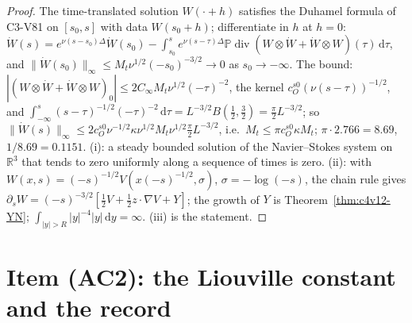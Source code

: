 \documentclass[11pt]{article}
\newcommand{\dd}{\,\mathrm d}
\newcommand{\PP}{\mathbb P}
\theoremstyle{plain}
\theoremstyle{definition}
\theoremstyle{remark}
\begin{document}
\begin{proof}
The time-translated solution \(W(\cdot+h)\) satisfies the Duhamel formula
of C3-V81 on \([s_0,s]\) with data \(W(s_0+h)\); differentiate in \(h\) at \(h=0\):
\(\dot W(s)=e^{\nu(s-s_0)\Delta}\dot W(s_0)-\int_{s_0}^se^{\nu(s-\tau)\Delta}\PP\operatorname{div}(W\otimes\dot W+\dot W\otimes W)(\tau)\dd\tau\), and
\(\|\dot W(s_0)\|_\infty\le M_t\nu^{1/2}(-s_0)^{-3/2}\to0\) as \(s_0\to-\infty\).  The bound:
\(|(W\otimes\dot W+\dot W\otimes W)_0|\le2C_\infty M_t\nu^{1/2}(-\tau)^{-2}\), the kernel \(c_O^{s0}(\nu(s-\tau))^{-1/2}\), and
\(\int_{-\infty}^s(s-\tau)^{-1/2}(-\tau)^{-2}\dd\tau=L^{-3/2}B(\frac12,\frac32)=\frac\pi2L^{-3/2}\); so
\(\|\dot W(s)\|_\infty\le2c_O^{s0}\nu^{-1/2}\kappa\nu^{1/2}M_t\nu^{1/2}\frac\pi2L^{-3/2}\), i.e.\ \(M_t\le\pi c_O^{s0}\kappa M_t\); \(\pi\cdot2.766=8.69\),
\(1/8.69=0.1151\).  (i): a steady bounded solution of the Navier--Stokes
system on \(\mathbb R^3\) that tends to zero uniformly along a sequence of
times is zero.  (ii): with \(W(x,s)=(-s)^{-1/2}V(x(-s)^{-1/2},\sigma)\), \(\sigma=-\log(-s)\), the chain
rule gives \(\partial_sW=(-s)^{-3/2}[\frac12V+\frac12z\cdot\nabla V+Y]\); the growth of \(Y\) is
Theorem~\ref{thm:c4v12-YN}; \(\int_{|y|>R}|y|^{-4}|y|\dd y=\infty\).  (iii) is the statement.
\end{proof}

\section{Item (AC2): the Liouville constant and the record}
\label{sec:c4v23-liouville}
\end{document}
